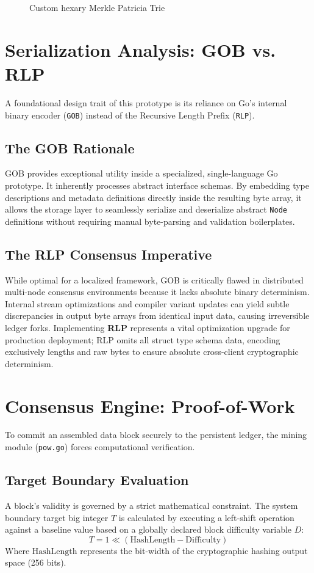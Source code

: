 \documentclass[10pt, conference]{IEEEtran}
\begin{document}
	\begin{figure}[htbp]
		\centering
		
		\caption{Custom hexary Merkle Patricia Trie}
		\label{fig:MPT}
	\end{figure}
	
	\section{Serialization Analysis: GOB vs. RLP}
	A foundational design trait of this prototype is its reliance on Go's internal binary encoder (\texttt{GOB}) instead of the Recursive Length Prefix (\texttt{RLP}).
	
	\subsection{The GOB Rationale}
	GOB provides exceptional utility inside a specialized, single-language Go prototype. It inherently processes abstract interface schemas. By embedding type descriptions and metadata definitions directly inside the resulting byte array, it allows the storage layer to seamlessly serialize and deserialize abstract \texttt{Node} definitions without requiring manual byte-parsing and validation boilerplates.
	
	\subsection{The RLP Consensus Imperative}
	While optimal for a localized framework, GOB is critically flawed in distributed multi-node consensus environments because it lacks absolute binary determinism. Internal stream optimizations and compiler variant updates can yield subtle discrepancies in output byte arrays from identical input data, causing irreversible ledger forks. Implementing \textbf{RLP} represents a vital optimization upgrade for production deployment; RLP omits all struct type schema data, encoding exclusively lengths and raw bytes to ensure absolute cross-client cryptographic determinism.
	
	\section{Consensus Engine: Proof-of-Work}
	To commit an assembled data block securely to the persistent ledger, the mining module (\texttt{pow.go}) forces computational verification. 
	
	\subsection{Target Boundary Evaluation}
	A block's validity is governed by a strict mathematical constraint. The system boundary target big integer $T$ is calculated by executing a left-shift operation against a baseline value based on a globally declared block difficulty variable $D$:
	\begin{equation}
		T = 1 \ll (\text{HashLength} - \text{Difficulty})
	\end{equation}
	Where $\text{HashLength}$ represents the bit-width of the cryptographic hashing output space (256 bits).
	
\end{document}
